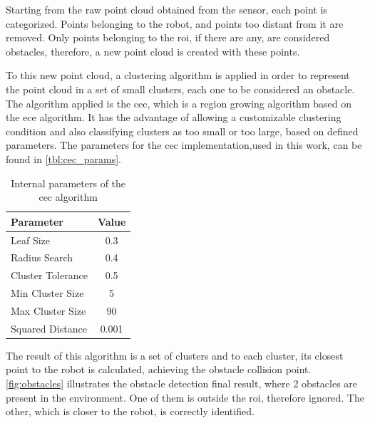 \par Starting from the raw point cloud obtained from the sensor, each point is categorized. Points belonging to the robot, and points too distant from it are removed. Only points belonging to the \ac{roi}, if there are any, are considered obstacles, therefore, a new point cloud is created with these points.

\par To this new point cloud, a clustering algorithm is applied in order to represent the point cloud in a set of small clusters, each one to be considered an obstacle. The algorithm applied is the \ac{cec}, which is a region growing algorithm based on the \ac{ece} algorithm. It has the advantage of allowing a customizable clustering condition and also classifying clusters as too small or too large, based on defined parameters. The parameters for the \ac{cec} implementation,used in this work, can be found in \autoref{tbl:cec_params}.

\begin{table}[h]
    \centering
    \begin{tabular}{|l|c|}
    \hline
    \textbf{Parameter} & \textbf{Value} \\ \hline
    Leaf Size & 0.3 \\ \hline
    Radius Search & 0.4 \\ \hline
    Cluster Tolerance & 0.5 \\ \hline
    Min Cluster Size & 5 \\ \hline
    Max Cluster Size & 90 \\ \hline
    Squared Distance & 0.001 \\ \hline
    \end{tabular}
    \caption{Internal parameters of the \ac{cec} algorithm}
    \label{tbl:cec_params}
\end{table}

\par The result of this algorithm is a set of clusters and to each cluster, its closest point to the robot is calculated, achieving the obstacle collision point. \autoref{fig:obstacles} illustrates the obstacle detection final result, where 2 obstacles are present in the environment. One of them is outside the \ac{roi}, therefore ignored. The other, which is closer to the robot, is correctly identified.

